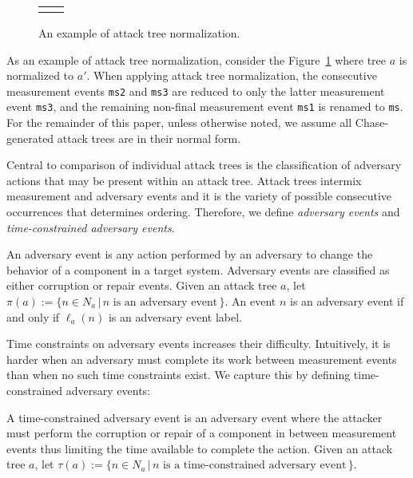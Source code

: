 \documentclass[runningheads]{llncs}
\theoremstyle{definition}
\begin{document}
\begin{figure}[htbp]
  \centering 
  \begin{tabular}{c c}
       &  
  \end{tabular}
  \captionsetup{justification=centering,margin=1cm}
  \caption[Example of attack tree normalization]{An example of attack tree normalization.}
  \label{fig:reduce-ex}
\end{figure}

\noindent As an example of attack tree normalization, consider the
Figure~\ref{fig:reduce-ex} where tree $a$ is normalized to $a'$. When
applying attack tree normalization, the consecutive measurement events
\texttt{ms2} and \texttt{ms3} are reduced to only the latter
measurement event \texttt{ms3}, and the remaining non-final
measurement event \texttt{ms1} is renamed to \texttt{ms}. For the
remainder of this paper, unless otherwise noted, we assume all
Chase-generated attack trees are in their normal form.

Central to comparison of individual attack trees is the classification
of adversary actions that may be present within an attack tree. Attack
trees intermix measurement and adversary events and it is the variety
of possible consecutive occurrences that determines
ordering. Therefore, we define \emph{adversary events} and
\emph{time-constrained adversary events}.

\begin{definition}
  An adversary event is any action performed by an adversary to
  change the behavior of a component in a target system. Adversary
  events are classified as either corruption or repair events. Given
  an attack tree $a$, let $\pi(a) := \{n \in N_a \,|\, n \text{ is
    an adversary event}\,\}$. An event $n$ is an adversary event if
  and only if $\ell_a(n)$ is an adversary event label. 
\end{definition}

Time constraints on adversary events increases their difficulty.
Intuitively, it is harder when an adversary must complete its work
between measurement events than when no such time constraints
exist. We capture this by defining time-constrained adversary events:

\begin{definition}
  A time-constrained adversary event is an adversary event where the
  attacker must perform the corruption or repair of a component in
  between measurement events thus limiting the time available to
  complete the action. Given an attack tree $a$, let $\tau(a) := \{n
  \in N_a \,|\, n \text{ is a time-constrained adversary
    event}\,\}$. 
\end{definition}
\end{document}
